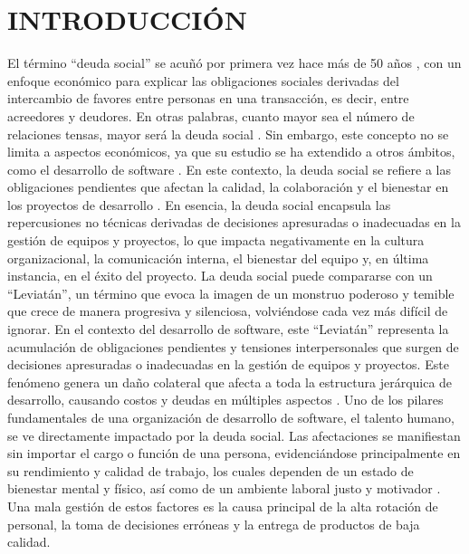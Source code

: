 \chapter*{INTRODUCCIÓN}

El término “deuda social” se acuñó por primera vez hace más de 50 años \cite{muir1962socialdebt}, con un enfoque económico para explicar las obligaciones sociales derivadas del intercambio de favores entre personas en una transacción, es decir, entre acreedores y deudores. En otras palabras, cuanto mayor sea el número de relaciones tensas, mayor será la deuda social \cite{caballero2022communitysmells}. Sin embargo, este concepto no se limita a aspectos económicos, ya que su estudio se ha extendido a otros ámbitos, como el desarrollo de software \cite{caballero2022communitysmells}. En este contexto, la deuda social se refiere a las obligaciones pendientes que afectan la calidad, la colaboración y el bienestar en los proyectos de desarrollo \cite{caballero2022communitysmells} \cite{tamburri2013socialdebt}. En esencia, la deuda social encapsula las repercusiones no técnicas derivadas de decisiones apresuradas o inadecuadas en la gestión de equipos y proyectos, lo que impacta negativamente en la cultura organizacional, la comunicación interna, el bienestar del equipo y, en última instancia, en el éxito del proyecto.
La deuda social puede compararse con un “Leviatán”, un término que evoca la imagen de un monstruo poderoso y temible que crece de manera progresiva y silenciosa, volviéndose cada vez más difícil de ignorar. En el contexto del desarrollo de software, este “Leviatán” representa la acumulación de obligaciones pendientes y tensiones interpersonales que surgen de decisiones apresuradas o inadecuadas en la gestión de equipos y proyectos. Este fenómeno genera un daño colateral que afecta a toda la estructura jerárquica de desarrollo, causando costos y deudas en múltiples aspectos \cite{caballero2022communitysmells}. Uno de los pilares fundamentales de una organización de desarrollo de software, el talento humano, se ve directamente impactado por la deuda social. Las afectaciones se manifiestan sin importar el cargo o función de una persona, evidenciándose principalmente en su rendimiento y calidad de trabajo, los cuales dependen de un estado de bienestar mental y físico, así como de un ambiente laboral justo y motivador \cite{caballero2022communitysmells}. Una mala gestión de estos factores es la causa principal de la alta rotación de personal, la toma de decisiones erróneas y la entrega de productos de baja calidad.
